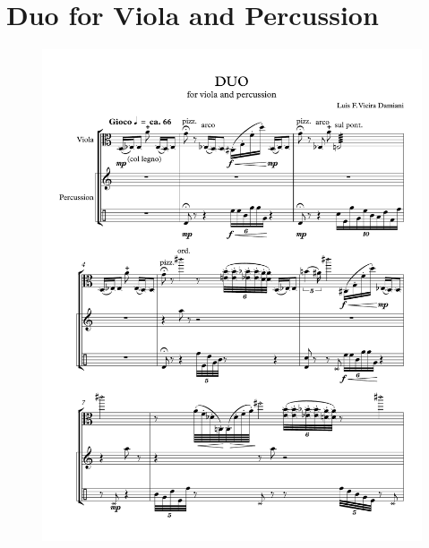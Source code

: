 \chapter{Duo for Viola and Percussion}

\begin{figure}[h!]
    \centering
	\includegraphics[width=6.5in]{figures/Viola_Percussion_1.pdf}
\end{figure}

